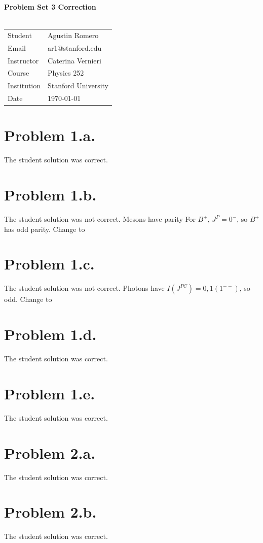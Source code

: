 \documentclass{article}
\begin{document}
\begin{center}
\textbf{\Large{Problem Set 3 Correction}}\\~\\
\begin{tabular}{l l}
Student&Agustin Romero\\
Email&ar1@stanford.edu\\
Instructor&Caterina Vernieri\\
Course&Physics 252\\
Institution&Stanford University\\
Date&\today\\
\end{tabular}
\end{center}
\section*{Problem 1.a.}
The student solution was correct.
\section*{Problem 1.b.}
The student solution was not correct. Mesons have parity
For $B^+$, $J^{P}=0^-$, so $B^+$ has odd parity. Change 
to
\section*{Problem 1.c.}
The student solution was not correct. Photons have $I(J^{PC})=0,1(1^{--})$, so odd. Change
to
\section*{Problem 1.d.}
The student solution was correct.
\section*{Problem 1.e.}
The student solution was correct.
\section*{Problem 2.a.}
The student solution was correct.
\section*{Problem 2.b.}
The student solution was correct.
\end{document}
